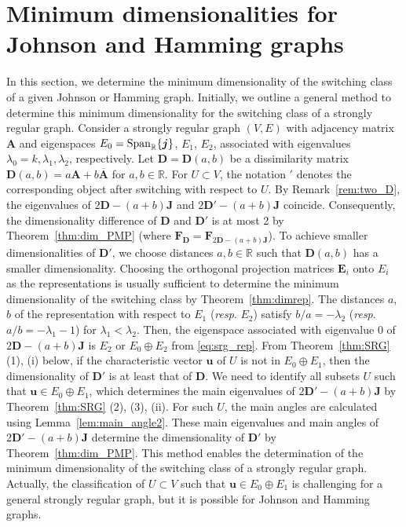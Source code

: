 \documentclass[a4paper, 11pt]{article}
\newcommand{\A}{\boldsymbol{A}}
\newcommand{\E}{\boldsymbol{E}}
\newcommand{\J}{\boldsymbol{J}}
\newcommand{\D}{\boldsymbol{D}}
\newcommand{\F}{\boldsymbol{F}}
\newcommand{\jv}{\boldsymbol{j}}
\newcommand{\uv}{\boldsymbol{u}}
\theoremstyle{definition}
\begin{document}
\section{Minimum dimensionalities for Johnson and Hamming graphs} \label{sec:4}
In this section, 
we determine the minimum dimensionality of the switching class of a given Johnson or Hamming graph. 
Initially, we outline a general method to determine this minimum dimensionality for the switching class of a strongly regular graph. 
Consider a strongly regular graph $(V,E)$ with adjacency matrix $\A$ and eigenspaces $E_0={\rm Span}_{\mathbb{R}}\{ \jv \}$, $E_1$, $E_2$, associated with eigenvalues $\lambda_0=k,\lambda_1,\lambda_2$, respectively.  
Let $\D=\D(a,b)$ be a dissimilarity matrix $\D(a,b)=a \A +b \overline{\A}$ for $a,b \in  \mathbb{R}$.  
For $U\subset V$, the notation $'$ denotes the corresponding object after switching with respect to $U$. 
By Remark~\ref{rem:two_D}, the eigenvalues of $2 \D-(a+b)\J$ and $2 \D'-(a+b)\J$ coincide. 
Consequently, the dimensionality difference of $\D$ and $\D'$ is at most 2 by Theorem~\ref{thm:dim_PMP} (where $\F_{\D}=\F_{2\D-(a+b)\J}$). 
To achieve smaller dimensionalities of $\D'$, we choose distances $a,b \in \mathbb{R}$ such that 
$\D(a,b)$ has a smaller dimensionality. 
Choosing the orthogonal projection matrices $\E_i$ onto $E_i$ as the representations is usually sufficient to determine the minimum dimensionality of the switching class by Theorem~\ref{thm:dimrep}. 
The distances $a$, $b$ of the representation with respect to $E_1$ ({\it resp}. $E_2$) satisfy $b/a=-\lambda_2$ ({\it resp}. $a/b=-\lambda_1-1$) \cite{BB05} for $\lambda_1<\lambda_2$. 
Then, the eigenspace associated with eigenvalue 0 of $2 \D-(a+b)\J$ is $E_2$ or $E_0 \oplus E_2$ from \eqref{eq:srg_rep}.  
From Theorem~\ref{thm:SRG} (1), (i) below, if the characteristic vector $\uv$ of $U$ is not in $E_0\oplus E_1$, 
then the dimensionality of $\D'$ is at least that of $\D$. 
We need to identify all subsets $U$ such that $\uv \in E_0\oplus E_1$, which determines the main eigenvalues of $2 \D'-(a+b)\J$ by Theorem~\ref{thm:SRG} (2), (3), (ii). 
For such $U$, the main angles are calculated using Lemma~\ref{lem:main_angle2}.  
These main eigenvalues and main angles of $2 \D'-(a+b)\J$ determine the dimensionality of $\D'$ by Theorem~\ref{thm:dim_PMP}. 
This method enables the determination of the minimum dimensionality of the switching class of a strongly regular graph. 
Actually, the classification of $U\subset V$ such that $\uv \in E_0\oplus E_1$ is challenging for a general strongly regular graph, but it is possible for Johnson and Hamming graphs. 
\end{document}
